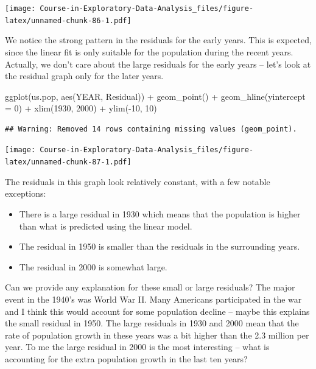 \documentclass[
]{book}
\newenvironment{Shaded}{\begin{snugshade}}{\end{snugshade}}
\newcommand{\AttributeTok}[1]{\textcolor[rgb]{0.77,0.63,0.00}{#1}}
\newcommand{\DecValTok}[1]{\textcolor[rgb]{0.00,0.00,0.81}{#1}}
\newcommand{\FunctionTok}[1]{\textcolor[rgb]{0.00,0.00,0.00}{#1}}
\newcommand{\NormalTok}[1]{#1}
\newcommand{\SpecialCharTok}[1]{\textcolor[rgb]{0.00,0.00,0.00}{#1}}
\providecommand{\tightlist}{%
  \setlength{\itemsep}{0pt}\setlength{\parskip}{0pt}}
\begin{document}
\texttt{[image: Course-in-Exploratory-Data-Analysis\_files/figure-latex/unnamed-chunk-86-1.pdf]}

We notice the strong pattern in the residuals for the early years. This is expected, since the linear fit is only suitable for the population during the recent years. Actually, we don't care about the large residuals for the early years -- let's look at the residual graph only for the later years.

\begin{Shaded}
\begin{Highlighting}[]
\FunctionTok{ggplot}\NormalTok{(us.pop, }\FunctionTok{aes}\NormalTok{(YEAR, Residual)) }\SpecialCharTok{+}
  \FunctionTok{geom\_point}\NormalTok{() }\SpecialCharTok{+}
  \FunctionTok{geom\_hline}\NormalTok{(}\AttributeTok{yintercept =} \DecValTok{0}\NormalTok{) }\SpecialCharTok{+}
  \FunctionTok{xlim}\NormalTok{(}\DecValTok{1930}\NormalTok{, }\DecValTok{2000}\NormalTok{) }\SpecialCharTok{+} \FunctionTok{ylim}\NormalTok{(}\SpecialCharTok{{-}}\DecValTok{10}\NormalTok{, }\DecValTok{10}\NormalTok{)}
\end{Highlighting}
\end{Shaded}

\begin{verbatim}
## Warning: Removed 14 rows containing missing values (geom_point).
\end{verbatim}

\texttt{[image: Course-in-Exploratory-Data-Analysis\_files/figure-latex/unnamed-chunk-87-1.pdf]}

The residuals in this graph look relatively constant, with a few notable exceptions:

\begin{itemize}
\tightlist
\item
  There is a large residual in 1930 which means that the population is higher than what is predicted using the linear model.
\item
  The residual in 1950 is smaller than the residuals in the surrounding years.
\item
  The residual in 2000 is somewhat large.
\end{itemize}

Can we provide any explanation for these small or large residuals? The major event in the 1940's was World War II. Many Americans participated in the war and I think this would account for some population decline -- maybe this explains the small residual in 1950. The large residuals in 1930 and 2000 mean that the rate of population growth in these years was a bit higher than the 2.3 million per year. To me the large residual in 2000 is the most interesting -- what is accounting for the extra population growth in the last ten years?
\end{document}
